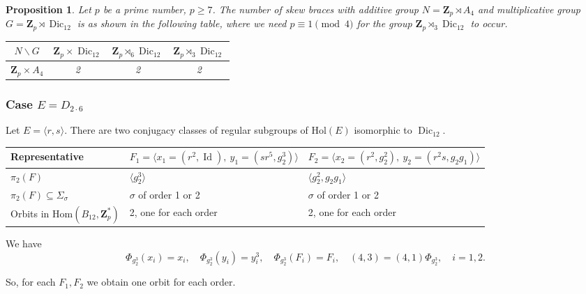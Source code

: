 \documentclass[12pt]{article}
\newtheorem{proposition}[theorem]{Proposition}
\theoremstyle{definition}
\newcommand{\Z}{\mathbf Z}
\newcommand{\Hol}{\mathrm{Hol}}
\newcommand{\Hom}{\mathrm{Hom}}
\newcommand{\Id}{\operatorname{Id}}
\newcommand{\Dic}{\operatorname{Dic}}
\begin{document}
\begin{proposition}
	Let $p$ be a prime number, $p\geq 7$. The number of skew braces with additive group $N=\Z_p \rtimes A_4$ and multiplicative group $G=\Z_p\rtimes \Dic_{12}$ is as shown in the following table, where we need $p\equiv 1 \pmod{4}$ for the group  $\Z_p\rtimes_{3} \Dic_{12}$ to occur.
	
	
	\begin{center}
		\begin{tabular}{|c||c|c|c|}
			\hline
			$N \backslash G$ & $\Z_p\times \Dic_{12}$ & $\Z_p\rtimes_{6} \Dic_{12}$ & $\Z_p\rtimes_{3} \Dic_{12}$ \\
			\hline
			\hline
			$\Z_p \times A_4$ &2&2&2\\
			\hline
			
		\end{tabular}
	\end{center}
\end{proposition}

\subsubsection*{Case $E=D_{2\cdot 6}$}

Let $E=\langle r, s\rangle$. There are two conjugacy classes of regular subgroups of $\Hol(E)$ isomorphic to $\Dic_{12}$. 



\begin{center}
    \begin{tabular}{|l|l|l|}
    \hline
     Representative & $F_1=\langle x_1=(r^2,\Id),\ y_1=(s r^5,g_2^3)\rangle $ &
     $F_2=\langle x_2=(r^2,g_2^2),\ y_2=(r^2 s,g_2 g_1)\rangle$\\
   \hline
   $\pi_2(F)$
     & $\langle g_2^3\rangle$ & 
     $\langle g_2^2,g_2g_1\rangle$ \\
     $\pi_2(F)\subseteq \Sigma_{\sigma}$& 
     $\sigma$ of order 1 or 2 &  $\sigma$ of order 1 or 2\\
     Orbits in $\Hom(B_{12},\Z_p^*)$ & 2, one for each order &2, one for each order \\ \hline
    \end{tabular}
\end{center}    

We have
$$
\Phi_{g_2^3}(x_i)=x_i,\quad \Phi_{g_2^3}(y_i)=y_i^3,
\quad \Phi_{g_2^3}(F_i)=F_i, \quad (4,3)=(4,1)\Phi_{g_2^3},
\quad i=1,2.$$

So, for each $F_1, F_2$ we obtain one orbit for each order.
\end{document}
